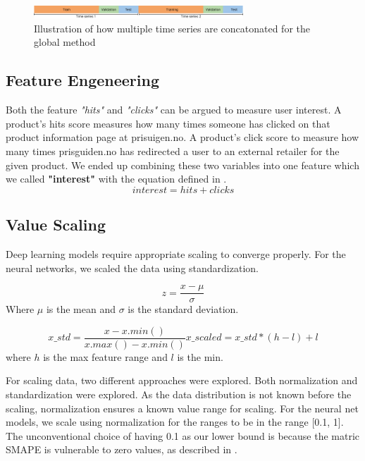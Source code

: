 \begin{figure}[h!]
  \centering
  \includegraphics[width=0.7\textwidth]{./figs/illustrations/illustration_global_time_series.png}
  \hfill
  \caption{Illustration of how multiple time series are concatonated for the global method}
  \label{fig:global-time-series}
\end{figure}



\subsection{Feature Engeneering}
Both the feature \textit{"hits"} and \textit{"clicks"} can be argued to measure
user interest. A product's hits score measures how many times someone has clicked
on that product information page at prisuigen.no. A product's click score to measure
how many times prisguiden.no has redirected a user to an external retailer for the given product.
We ended up combining these two variables into one feature which we called \textbf{"interest"}
with the equation defined in .
\begin{equation}
  interest = hits + clicks
  \label{eq:interest}
\end{equation}




\subsection{Value Scaling}
\label{section:Data:Preprocessing:value-scaling}
Deep learning models require appropriate scaling to converge properly.
For the neural networks, we scaled the data using standardization.

\begin{equation}
  z = \frac{x - \mu}{\sigma}
\end{equation}
Where $\mu$ is the mean and $\sigma$ is the standard deviation.

\begin{equation}
  x\_std = \frac{x - x.min()}{x.max() - x.min()}
  x\_scaled = x\_std * (h - l) + l
\end{equation}
where $h$ is the max feature range and $l$ is the min.

For scaling data, two different approaches were explored.
Both normalization and standardization were explored.
As the data distribution is not known before the scaling, normalization ensures a known value range for scaling.
For the neural net models, we scale using normalization for the ranges to be in the range [0.1, 1].
The unconventional choice of having 0.1 as our lower bound is because the matric SMAPE
is vulnerable to zero values, as described in .

